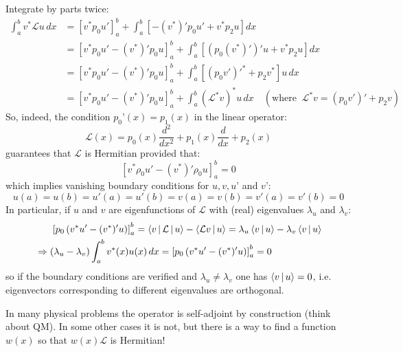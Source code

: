 \documentclass{article}
\begin{document}
\noindent
Integrate by parts twice:
\begin{align*}
    \int_a^b v^* \mathcal{L}u\, dx 
&= \left[ v^* p_0 u' \right]_a^b 
+ \int_a^b \left[ -(v^*)' p_0 u' + v^* p_2 u \right] dx \\
&= \left[ v^* p_0 u' - (v^*)' p_0 u \right]_a^b 
+ \int_a^b \left[ \left( p_0 (v^*)' \right)' u + v^* p_2 u \right] dx \\
&= \left[ v^* p_0 u' - (v^*)' p_0 u \right]_a^b 
+ \int_a^b \left[ \left( p_0 v' \right)'^* + p_2 v^* \right] u\, dx \\
&= \left[ v^* p_0 u' - (v^*)' p_0 u \right]_a^b 
+ \int_a^b \left( \mathcal{L}^* v \right)^* u\, dx \quad (\text{where } \ \mathcal{L}^* v = \left( p_0 v' \right)' + p_2 v)
\end{align*}
So, indeed, the condition $p_0’(x)=p_1(x)$ in the linear operator:
\begin{equation}
    \mathcal{L}(x) = p_0(x) \frac{d^2}{dx^2} + p_1(x) \frac{d}{dx} + p_2(x)
\end{equation}
guarantees that $\mathcal{L}$ is Hermitian provided that:
\begin{equation}
    \left[ v^* \rho_0 u' - (v^*)' \rho_0 u \right]_a^b = 0
\end{equation}
which implies vanishing boundary conditions for $u,v,u’$ and $v’$:
\begin{equation}
    u(a) = u(b) = u'(a) = u'(b) = v(a) = v(b) = v'(a) = v'(b) = 0
\end{equation}
\newpage
\noindent
In particular, if $u$ and $v$ are eigenfunctions of $\mathcal{L}$ with (real) eigenvalues $\lambda_u$ and $\lambda_v$:
\begin{align}
        &\quad \ \ \left[ p_0 \left( v^{*} u' - (v^{*})' u \right) \right]_a^b = 
\Braket{v | \mathcal{L} | u} - \Braket{\mathcal{L} v | u} 
= \lambda_u \Braket{v | u} - \lambda_v \Braket{v | u}\\
&\Rightarrow \left( \lambda_u - \lambda_v \right)
\int_a^b v^*(x) u(x)\, dx
= \left[ p_0 \left( v^* u' - (v^*)' u \right) \right]_a^b = 0
\end{align}
so if the boundary conditions are verified and $\lambda_u \neq \lambda_v$ one has $\Braket{v|u} = 0$, i.e. eigenvectors corresponding to different eigenvalues are orthogonal.

\noindent
In many physical problems the operator is self-adjoint by construction (think about QM). In some other cases it is not, but there is a way to find a function $w(x)$ so that $w(x)\mathcal{L}$ is Hermitian!
\end{document}
